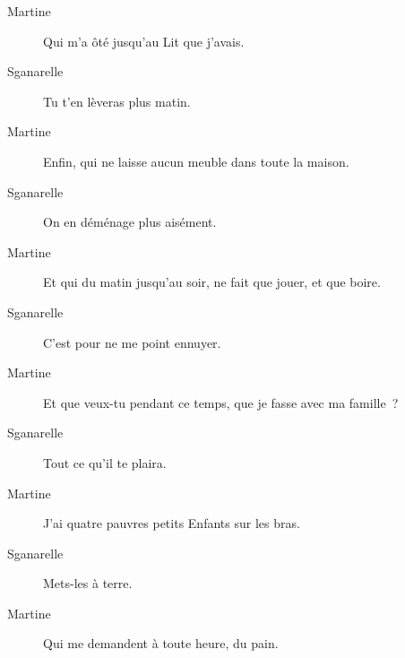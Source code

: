 \documentclass[french,twoside]{book} %
\begin{document}
 \begin{description} \item[Martine] 

Qui m’a ôté jusqu’au Lit que j’avais.\end{description}
 \begin{description} \item[Sganarelle] 

Tu t’en lèveras plus matin.\end{description}
 \begin{description} \item[Martine] 

Enfin, qui ne laisse aucun meuble dans toute la maison.\end{description}
 \begin{description} \item[Sganarelle] 

On en déménage plus aisément.\end{description}
 \begin{description} \item[Martine] 

Et qui du matin jusqu’au soir, ne fait que jouer, et que boire.\end{description}
 \begin{description} \item[Sganarelle] 

C’est pour ne me point ennuyer.\end{description}
 \begin{description} \item[Martine] 

Et que veux-tu pendant ce temps, que je fasse avec ma famille ?\end{description}
 \begin{description} \item[Sganarelle] 

Tout ce qu’il te plaira.\end{description}
 \begin{description} \item[Martine] 

J’ai quatre pauvres petits Enfants sur les bras.\end{description}
 \begin{description} \item[Sganarelle] 

Mets-les à terre.\end{description}
 \begin{description} \item[Martine] 

Qui me demandent à toute heure, du pain.\end{description}
\end{document}
